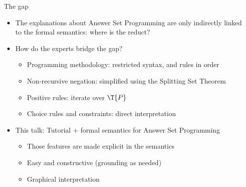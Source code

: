\begin{frame}{The gap}
\begin{itemize}
  \item<1-> The explanations about Answer Set Programming are 
        only indirectly linked to the formal semantics:
        \alert<1>{where is the reduct?}
  \bigskip
  \item<2-> How do \alert<2>{the experts} bridge the gap?
  \begin{itemize}
    \item Programming methodology: restricted syntax, and rules in order
    \item Non-recursive negation: simplified using the Splitting Set Theorem
    \item Positive rules: iterate over $\T{P}$ 
    \item Choice rules and constraints: direct interpretation
  \end{itemize}
  \bigskip 
  \item<3-> \alert<3>{This talk:}
  Tutorial + formal semantics for Answer Set Programming
  \begin{itemize}
    \item Those features are made explicit in the semantics
    \item Easy and constructive (grounding as needed) 
    \item Graphical interpretation
  \end{itemize}
\end{itemize}
\end{frame}

